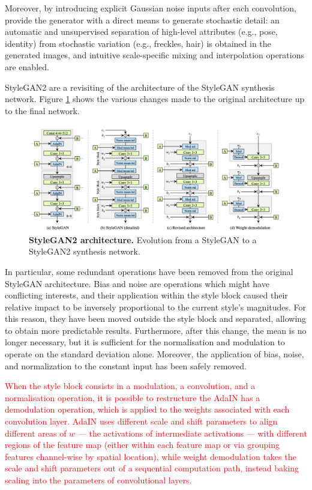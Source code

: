 \documentclass{article}
\begin{document}
	Moreover, by introducing explicit Gaussian noise inputs after each convolution, 
	\citet{karras2019style} provide the generator with a direct means to generate stochastic detail: an 
	automatic and unsupervised separation of high-level attributes (e.g., pose, identity) from stochastic 
	variation (e.g., freckles, hair) is obtained in the generated images, and intuitive scale-specific mixing 
	and interpolation operations are enabled.
	
	StyleGAN2 \cite{karras2020analyzing} are a revisiting of the architecture of the StyleGAN synthesis 
	network. Figure \ref{fig:styleGAN2} shows the various changes made to the original architecture up 
	to the final network.
	\begin{figure}[htb]				
		\centering
		\includegraphics[width=\linewidth]{images/styleGAN2}
		\caption{\textbf{StyleGAN2 architecture.} Evolution from a StyleGAN to a StyleGAN2 synthesis 
			network.}
		\label{fig:styleGAN2}
	\end{figure}
	
	In particular, some redundant operations have been removed from the original StyleGAN architecture.
	Bias and noise are operations which might have conflicting interests, and their application within the 
	style block caused their relative impact to be inversely proportional to the current style’s 
	magnitudes. For this reason, they have been moved outside the style block and separated, allowing 
	to obtain more predictable results.
	Furthermore, after this change, the mean is no longer necessary, but it is sufficient for the 
	normalisation and modulation to operate on the standard deviation alone.
	Moreover, the application of bias, noise, and normalization to the constant input has been safely 
	removed. 
	
	\textcolor{red}{
		When the style block consists in a modulation, a convolution, and a normalisation operation, it is 
		possible to restructure the AdaIN has a demodulation operation, which is applied to the weights 
		associated with each convolution layer. 
		AdaIN uses different scale and shift parameters to align different areas of $w$ — the activations 
		of 
		intermediate activations — with different regions of the feature map (either within each feature 
		map 
		or via grouping features channel-wise by spatial location), while weight demodulation takes the 
		scale 
		and shift parameters out of a sequential computation path, instead baking scaling into the 
		parameters of convolutional layers.}
	
\end{document}

